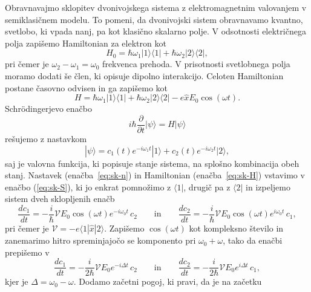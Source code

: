 Obravnavajmo sklopitev dvonivojskega sistema z elektromagnetnim valovanjem 
v semiklasičnem modelu. 
To pomeni, da dvonivojski sistem obravnavamo kvantno, 
svetlobo, ki vpada nanj, pa kot klasično skalarno polje. 
V odsotnosti električnega polja zapišemo Hamiltonian za elektron kot
\begin{equation}
H_0 = \hbar \omega_1 |1\rangle \langle1| + \hbar \omega_2 |2\rangle \langle2|,
\end{equation}
pri čemer je $\omega_2- \omega_1 = \omega_0$ frekvenca prehoda. V prisotnosti 
svetlobnega polja moramo dodati še člen, ki opisuje dipolno interakcijo. Celoten
Hamiltonian postane časovno odvisen in ga zapišemo kot
\begin{equation}
H = \hbar \omega_1 |1\rangle \langle1| + \hbar \omega_2 |2\rangle \langle2|
-e\hat{x}E_0 \cos (\omega t).
\label{eq:sk-H}
\end{equation}
Schr\"odingerjevo enačbo
\begin{equation}
i \hbar \frac{\partial}{\partial t}|\psi\rangle = H|\psi\rangle
\label{eq:sk-S}
\end{equation}
rešujemo z nastavkom 
\begin{equation}
|\psi\rangle = c_1(t)e^{-i \omega_1t}|1\rangle + c_2(t)e^{-i \omega_2t}|2\rangle,
\label{eq:sk-n}
\end{equation}
saj je valovna funkcija, ki popisuje stanje sistema, na splošno
kombinacija obeh stanj. Nastavek (enačba~\ref{eq:sk-n}) in Hamiltonian 
(enačba~\ref{eq:sk-H}) vstavimo v enačbo (\ref{eq:sk-S}), ki jo enkrat pomnožimo 
z $\langle1|$, drugič pa z $\langle2|$ in izpeljemo sistem dveh sklopljenih enačb
\begin{equation}
\frac{d c_1}{dt}=-\frac{i}{\hbar} \mathcal{V} E_0\cos (\omega t) e^{-i\omega_0 t}\, c_2 
\qquad \mathrm{in} \qquad
\frac{d c_2}{dt}=-\frac{i}{\hbar} \mathcal{V} E_0\cos (\omega t) e^{i\omega_0 t}\, c_1,
\label{eq:c1c2}
\end{equation}
pri čemer je $\mathcal{V} = -e\langle1|\hat{x}|2\rangle$. Zapišemo $\cos(\omega t)$ kot
kompleksno število in zanemarimo hitro spreminjajočo se komponento pri $\omega_0 + \omega$,
tako da enačbi prepišemo v 
\begin{equation}
\frac{d c_1}{dt}=-\frac{i}{2\hbar} \mathcal{V} E_0 e^{-i\Delta t}\, c_2 
\qquad \mathrm{in} \qquad
\frac{d c_2}{dt}=-\frac{i}{2\hbar} \mathcal{V} E_0 e^{i\Delta t}\, c_1,
\label{eq:rabi2}
\end{equation}
kjer je $\Delta = \omega_0-\omega$. Dodamo začetni pogoj, ki pravi, da je na začetku
